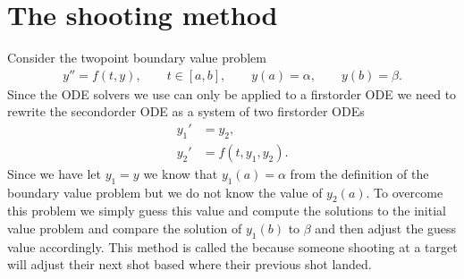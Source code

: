 \documentclass[letterpaper,10pt,english]{jupyterBook}
\begin{document}
\section{The shooting method}
\label{\detokenize{5_BVPs/5.1_Shooting_method:the-shooting-method}}\label{\detokenize{5_BVPs/5.1_Shooting_method:shooting-method-section}}\label{\detokenize{5_BVPs/5.1_Shooting_method::doc}}
\sphinxAtStartPar
Consider the two\sphinxhyphen{}point boundary value problem
\begin{equation*}
\begin{split}y'' = f(t,y), \qquad t \in [a, b], \qquad y(a) = \alpha ,\qquad y(b) = \beta.\end{split}
\end{equation*}
\sphinxAtStartPar
Since the ODE solvers we use can only be applied to a first\sphinxhyphen{}order ODE we need to rewrite the second\sphinxhyphen{}order ODE as a system of two first\sphinxhyphen{}order ODEs
\begin{align*}
    y_1' &= y_2 ,\\
    y_2' &= f(t, y_1, y_2).
\end{align*}
\sphinxAtStartPar
Since we have let \(y_1 = y\) we know that \(y_1(a) = \alpha\) from the definition of the boundary value problem but we do not know the value of \(y_2(a)\). To overcome this problem we simply guess this value and compute the solutions to the initial value problem and compare the solution of \(y_1(b)\) to \(\beta\) and then adjust the guess value accordingly. This method is called the  because someone shooting at a target will adjust their next shot based where their previous shot landed.
\end{document}

